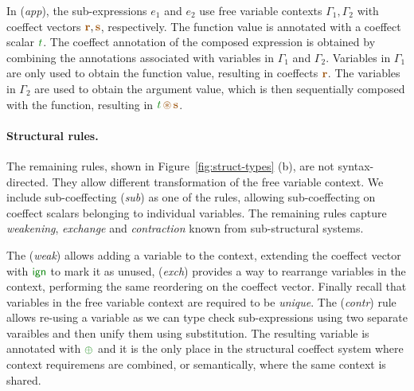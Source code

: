 In (\emph{app}), the sub-expressions $e_1$ and $e_2$ use free variable contexts $\Gamma_1, \Gamma_2$
with coeffect vectors $\aclrd{\textbf{r}}, \aclrd{\textbf{s}}$, respectively. The function
value is annotated with a coeffect scalar $\cclrd{t}$.
The coeffect annotation of the composed expression is obtained by combining the annotations
associated with variables in $\Gamma_1$ and $\Gamma_2$. Variables in $\Gamma_1$ are only
used to obtain the function value, resulting in coeffects $\aclrd{\textbf{r}}$. The 
variables in $\Gamma_2$ are used to obtain the argument value, which is then sequentially
composed with the function, resulting in $\cclrd{t}\,\aseq\,\aclrd{\textbf{s}}$.

\paragraph{Structural rules.}
The remaining rules, shown in Figure~\ref{fig:struct-types} (b), are not syntax-directed.
They allow different transformation of the free variable context. We include sub-coeffecting
(\emph{sub}) as one of the rules, allowing sub-coeffecting on coeffect scalars belonging
to individual variables. The remaining rules capture \emph{weakening}, \emph{exchange} and
\emph{contraction} known from sub-structural systems.

The (\emph{weak}) allows adding a variable to the context, extending the coeffect
vector with $\czero$ to mark it as unused, (\emph{exch}) provides a way to rearrange variables
in the context, performing the same reordering on the coeffect vector. Finally recall that 
variables in the free variable context are required to be \emph{unique}. The (\emph{contr}) rule 
allows re-using a variable as we can type check sub-expressions using two separate varaibles and 
then unify them using substitution. The resulting variable is annotated with $\cpar$ and it
is the only place in the structural coeffect system where context requiremens are combined,
or semantically, where the same context is shared.


